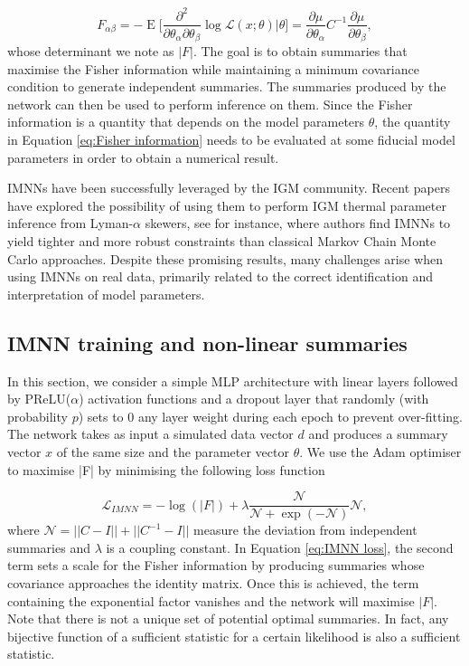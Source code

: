\begin{equation}\label{eq:Fisher information}
    F_{\alpha \beta} =-\operatorname{E}\bigg[\frac{\partial^2}{\partial\theta_\alpha\partial\theta_\beta}\log \mathcal{L}(x;\theta)\bigg|\theta\bigg]= \frac{\partial \mu}{\partial \theta_\alpha}C^{-1} \frac{\partial \mu}{\partial \theta_\beta},
\end{equation}
whose determinant we note as $|F|$. 
The goal is to obtain summaries that maximise the Fisher information while maintaining a minimum covariance condition to generate independent summaries. The summaries produced by the network can then be used to perform inference on them. Since the Fisher information is a quantity that depends on the model parameters $\theta$, the quantity in Equation \ref{eq:Fisher information} needs to be evaluated at some fiducial model parameters in order to obtain a numerical result.

IMNNs have been successfully leveraged by the IGM community. Recent papers have explored the possibility of using them to perform IGM thermal parameter inference from Lyman-$\alpha$ skewers, see \cite{maitra2024parameterestimationlyalphaforest} for instance, where authors find IMNNs to yield tighter and more robust constraints than classical Markov Chain Monte Carlo approaches. Despite these promising results, many challenges arise when using IMNNs on real data, primarily related to the correct identification and interpretation of model parameters.

\subsection{IMNN training and non-linear summaries}
In this section, we consider a simple MLP architecture with linear layers followed by PReLU($\alpha$) activation functions and a dropout layer that randomly (with probability $p$) sets to 0 any layer weight during each epoch to prevent over-fitting. The network takes as input a simulated data vector $d$ and produces a summary vector $x$ of the same size and the parameter vector $\theta$. We use the Adam optimiser to maximise |F| by minimising the following loss function

\begin{equation}\label{eq:IMNN loss}
    \mathcal{L}_{IMNN} = - \log(|F|) + \lambda \frac{\mathcal{N}}{\mathcal{N}+\exp(-\mathcal{N})} \mathcal{N},
\end{equation}
where $\mathcal{N}=||C-I||+||C^{-1}-I||$ measure the deviation from independent summaries and $\lambda$ is a coupling constant. In Equation \ref{eq:IMNN loss}, the second term sets a scale for the Fisher information by producing summaries whose covariance approaches the identity matrix. Once this is achieved, the term containing the exponential factor vanishes and the network will maximise $|F|$. Note that there is not a unique set of potential optimal summaries. In fact, any bijective function of a sufficient statistic for a certain likelihood is also a sufficient statistic.

